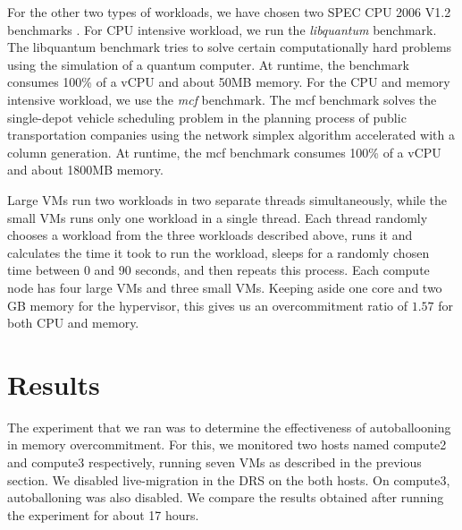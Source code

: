 For the other two types of workloads, we have chosen two SPEC CPU 2006 V1.2 benchmarks \cite{Henning:2006:SCB:1186736.1186737}. For CPU intensive workload, we run the \textit{libquantum} benchmark. The libquantum benchmark tries to solve certain computationally hard problems using the simulation of a quantum computer. At runtime, the benchmark consumes 100\% of a vCPU and about 50MB memory. For the CPU and memory intensive workload, we use the \textit{mcf} benchmark. The mcf benchmark solves the single-depot vehicle scheduling problem in the planning process of public transportation companies using the network simplex algorithm accelerated with a column generation. At runtime, the mcf benchmark consumes 100\% of a vCPU and about 1800MB memory.

Large VMs run two workloads in two separate threads simultaneously, while the small VMs runs only one workload in a single thread. Each thread randomly chooses a workload from the three workloads described above, runs it and calculates the time it took to run the workload, sleeps for a randomly chosen time between 0 and 90 seconds, and then repeats this process. Each compute node has four large VMs and three small VMs. Keeping aside one core and two GB memory for the hypervisor, this gives us an overcommitment ratio of $1.57$ for  both CPU and memory.

\section{Results}
The experiment that we ran was to determine the effectiveness of autoballooning in memory overcommitment. For this, we monitored two hosts named compute2 and compute3 respectively, running seven VMs as described in the previous section. We disabled live-migration in the DRS on the both hosts. On compute3, autoballoning was also disabled. We compare the results obtained after running the experiment for about 17 hours.

